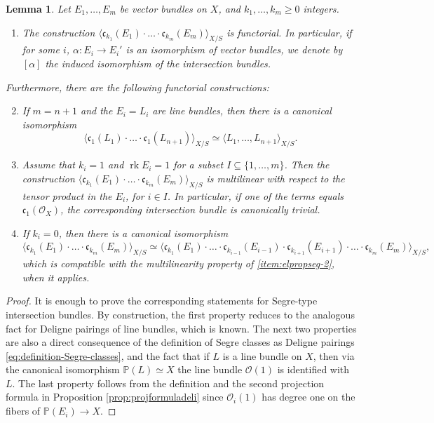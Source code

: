 \documentclass[11pt]{article}
\theoremstyle{plain}
\newtheorem{lemma}[theorem]{Lemma}
\theoremstyle{definition}
\newcommand{\PBbb}{\mathbb P}
\newcommand{\Ocal}{\mathcal O}
\newcommand{\cfrak}{\mathfrak c}
\DeclareMathOperator{\rk}{rk}
\begin{document}
\begin{lemma}\label{lemma:elementary-properties-segre}
Let $E_{1},\ldots, E_{m}$ be vector bundles on $X$, and $k_{1},\ldots, k_{m}\geq 0$ integers.
\begin{enumerate}
\item\label{item:elpropsef-0} The construction $\langle \cfrak_{k_{1}}(E_{1})\cdot\ldots \cdot \cfrak_{k_{m}}(E_{m})\rangle_{X/S}$ is functorial. In particular, if for some $i$, $\alpha: E_i \to E_i'$ is an isomorphism of vector bundles, we denote by $[\alpha]$ the induced isomorphism of the intersection bundles.
\end{enumerate}
Furthermore, there are the following functorial constructions:
\begin{enumerate}
\setcounter{enumi}{1}
\item\label{item:elpropseg-1} If $m=n+1$ and the $E_{i}=L_{i}$ are line bundles, then there is a canonical isomorphism
\begin{displaymath}
\langle \cfrak_{1}(L_1)\cdot \ldots\cdot \cfrak_{1}(L_{n+1}) \rangle_{X/S}\simeq
\langle L_{1},\ldots, L_{n+1}\rangle_{X/S}.
\end{displaymath}
\item\label{item:elpropseg-2} Assume that $k_{i}=1$ and $\rk E_{i}=1$ for a subset $I\subseteq\lbrace 1,\ldots, m\rbrace$. Then the construction $\langle \cfrak_{k_1}(E_1)\cdot \ldots\cdot \cfrak_{k_{m}}(E_m) \rangle_{X/S}$ is multilinear with respect to the tensor product in the $E_{i}$, for $i\in I$. In particular, if one of the terms equals $\cfrak_1(\Ocal_X)$, the corresponding intersection bundle is canonically trivial.
\item\label{item:elpropseg-3} If $k_{i}=0$, then there is a canonical isomorphism
\begin{displaymath}
\langle \cfrak_{k_1}(E_1)\cdot \ldots\cdot \cfrak_{k_m}(E_m) \rangle_{X/S}\simeq
\langle\cfrak_{k_{1}}(E_{1})\cdot\ldots \cdot\cfrak_{k_{i-1}}(E_{i-1})\cdot\cfrak_{k_{i+1}}(E_{i+1})\cdot\ldots\cdot\cfrak_{k_{m}}(E_m)\rangle_{X/S},
\end{displaymath}
which is compatible with the multilinearity property of \eqref{item:elpropseg-2}, when it applies.
\end{enumerate}
\end{lemma}
\begin{proof}
It is enough to prove the corresponding statements for Segre-type intersection bundles. By construction, the first property reduces to the analogous fact for Deligne pairings of line bundles, which is known. The next two properties are also a direct consequence of the definition of Segre classes as Deligne pairings \eqref{eq:definition-Segre-classes}, and the fact that if $L$ is a line bundle on $X$, then via the canonical isomorphism $\PBbb(L)\simeq X$ the line bundle $\Ocal(1)$ is identified with $L$. The last property follows from the definition and the second projection formula in Proposition \ref{prop:projformuladeli} since $\Ocal_{i}(1)$ has degree one on the fibers of $\PBbb(E_{i})\to X$.
\end{proof}
\end{document}
